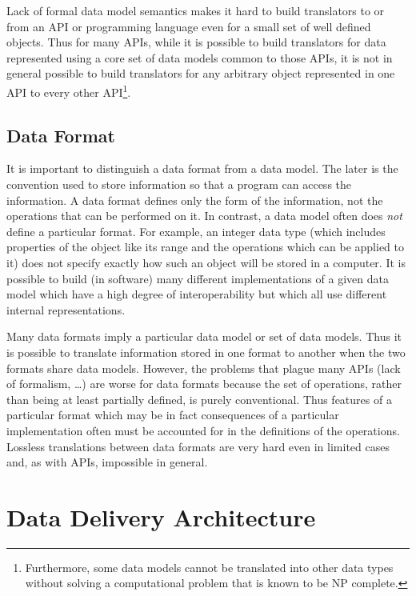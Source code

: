 Lack of formal data model semantics makes it hard to build translators to or
from an API or programming language even for a small set of well defined
objects.  Thus for many APIs, while it is possible to build translators for
data represented using a core set of data models common to those APIs, it is
not in general possible to build translators for any arbitrary object
represented in one API to every other API\footnote{Furthermore, some data
models cannot be translated into other data types without solving a
computational problem that is known to be NP complete.}.

\subsection{Data Format}

It is important to distinguish a data format from a data model. The later is
the convention used to store information so that a program can access the
information. A data format defines only the form of the information, not the
operations that can be performed on it. In contrast, a data model often does
{\em not\/} define a particular format. For example, an integer data type
(which includes properties of the object like its range and the operations
which can be applied to it) does not specify exactly how such an object will
be stored in a computer. It is possible to build (in software) many different
implementations of a given data model which have a high degree of
interoperability but which all use different internal representations.

Many data formats imply a particular data model or set of data models. Thus
it is possible to translate information stored in one format to another when
the two formats share data models. However, the problems that plague many
APIs (lack of formalism, \ldots) are worse for data formats because the set
of operations, rather than being at least partially defined, is purely
conventional. Thus features of a particular format which may be in fact
consequences of a particular implementation often must be accounted for in
the definitions of the operations. Lossless translations between data formats
are very hard even in limited cases and, as with APIs, impossible in general.

\section{Data Delivery Architecture}

